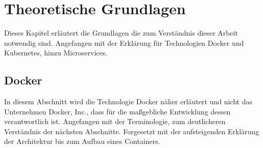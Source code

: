 \chapter{Theoretische Grundlagen}
Dieses Kapitel erläutert die Grundlagen die zum 
Verständnis dieser Arbeit notwendig sind. 
Angefangen mit der Erklärung für Technologien
Docker und Kubernetes, hinzu Microservices.


\section{Docker}

In diesem Abschnitt wird die Technologie \glqq Docker\grqq{} näher erläutert und
nicht das Unternehmen \glqq Docker, Inc.\grqq{}, dass für die maßgebliche Entwicklung dessen verantwortlich ist.
Angefangen mit der Terminologie, zum deutlicheren Verständnis der nächsten Abschnitte.
Forgesetzt mit der aufsteigenden Erklärung der Architektur bis zum Aufbau eines Containers.


